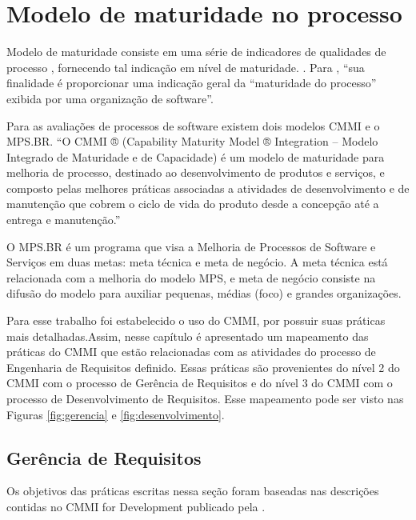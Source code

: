 \chapter{Modelo de maturidade no processo}

Modelo de maturidade consiste em uma série de indicadores de qualidades de processo , fornecendo tal indicação em nível de maturidade. \cite{pressman}. Para , “sua finalidade é proporcionar uma indicação geral da “maturidade do processo” exibida por uma organização de software”.

Para as avaliações de processos de software existem dois modelos CMMI e o MPS.BR. “O CMMI ® (Capability Maturity Model ® Integration – Modelo Integrado de Maturidade e de Capacidade) é um modelo de maturidade para melhoria de processo, destinado ao desenvolvimento de produtos e serviços, e composto pelas melhores práticas associadas a atividades de desenvolvimento e de manutenção que cobrem o ciclo de vida do produto desde a concepção até a entrega e manutenção.” \cite{cmmi}

O MPS.BR é um programa que visa a Melhoria de Processos de Software e Serviços em duas metas: meta técnica e meta de negócio. A meta técnica está relacionada com a melhoria do modelo MPS, e meta de negócio consiste na difusão do modelo para auxiliar pequenas, médias (foco) e grandes organizações. \cite{mps}

Para esse trabalho foi estabelecido o uso do CMMI, por possuir suas práticas mais detalhadas.Assim, nesse capítulo
é apresentado um mapeamento das práticas do CMMI que estão relacionadas com as atividades do processo 
de Engenharia de Requisitos definido. Essas práticas são provenientes do nível 2 do CMMI com o processo
de Gerência de Requisitos e do nível 3 do CMMI com o processo de Desenvolvimento de Requisitos. Esse mapeamento pode
ser visto nas Figuras \ref{fig:gerencia} e \ref{fig:desenvolvimento}.

\section{Gerência de Requisitos}

Os objetivos das práticas escritas nessa seção foram baseadas nas descrições contidas no CMMI for Development publicado pela .

